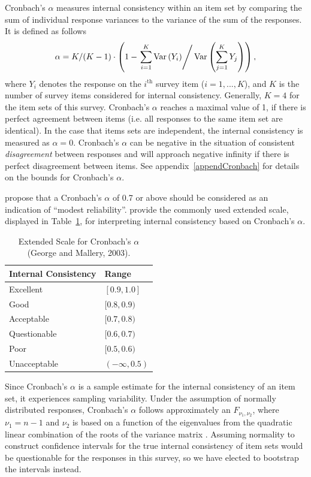 \documentclass[11pt]{isuthesis}\usepackage[]{graphicx}\usepackage[]{color}
\newcommand{\V}[1]{\text{Var}\left(#1\right)}
\begin{document}
Cronbach's $\alpha$ measures internal consistency within an item set by comparing the sum of individual response variances to the variance of the sum of the responses. It is defined as follows
%
\begin{equation} \label{eq:alpha}
\alpha = K/(K-1) \cdot \left(1 - \left . \sum_{i=1}^K \V{Y_i} \right /  \V{\sum_{j=1}^K Y_j}\right),
\end{equation}
%
where $Y_i$ denotes the response on the $i^{\text{th}}$ survey item ($ i = 1,... , K$), and $K$ is the number of survey items considered for internal consistency. Generally, $K=4$ for the item sets of this survey.
Cronbach's $\alpha$ reaches a maximal value of 1, if there is perfect agreement between items (i.e. all responses to the same item set are identical). In the case that items sets are independent, the internal consistency is measured as $\alpha = 0 $. Cronbach's $\alpha$ can be negative in the situation of consistent \textit{disagreement} between responses and will approach negative infinity if there is perfect disagreement between items.  See appendix~\ref{appendCronbach} for details on the bounds for Cronbach's $\alpha$. 

\citet{Nunnally1978} propose that a Cronbach's $\alpha$ of 0.7 or above should be considered as an indication of ``modest reliability''.   \citet{GeorgeMallery2003} provide the commonly used extended scale, displayed in Table~\ref{GMAlphaScale}, for interpreting internal consistency based on Cronbach's $\alpha$. \\

\begin{table}[hbtp]
\centering
\begin{tabular}{ll}
\hline 
Internal Consistency & Range \\
\hline
Excellent &  $[ 0.9 , 1.0 ]$ \\
Good & $[ 0.8 , 0.9 )$ \\
Acceptable & $[ 0.7 , 0.8 ) $\\
Questionable & $[ 0.6 , 0.7 )$ \\
Poor & $[ 0.5 , 0.6 )$ \\
Unacceptable & $( -\infty, 0.5 )$ \\
\hline
\end{tabular}
\caption{Extended Scale for Cronbach's $\alpha$  (George and Mallery, 2003).} 
\label{GMAlphaScale}
\end{table}

Since Cronbach's $\alpha$ is a sample estimate for the internal consistency of an item set, it experiences sampling variability. Under the assumption of normally distributed responses, Cronbach's $\alpha$ follows approximately an $F_{\nu_1,\nu_2}$, where $\nu_1 = n-1$ and $\nu_2$ is based on a function of the eigenvalues from the quadratic linear combination of the roots of the variance matrix \citep{KistnerMuller2004}. Assuming normality to construct confidence intervals for the true internal consistency of item sets would be questionable for the responses in this survey, so we have elected to bootstrap the intervals instead.
\end{document}
